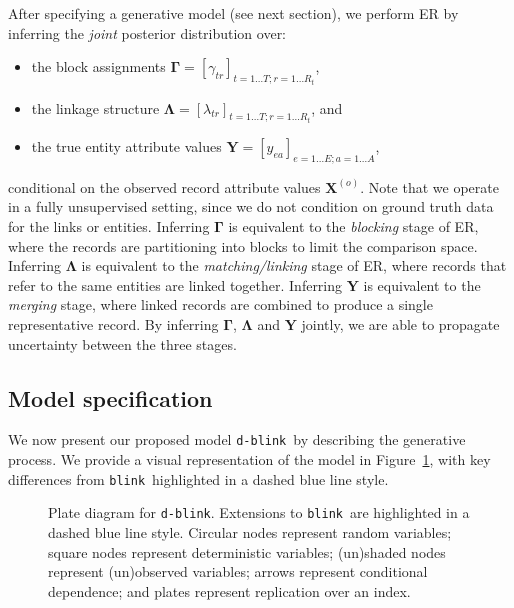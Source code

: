 \documentclass[12pt,letterpaper]{article}
\renewcommand\vec{\bm}
\newcommand{\1}[1]{\mathbb{I}\!\left[#1\right]} %
\newcommand{\dblink}{\texttt{\upshape \lowercase{d-blink}}} %
\newcommand{\blink}{\texttt{\upshape \lowercase{blink}}} %
\begin{document}
After specifying a generative model (see next section), we perform 
ER by inferring the \emph{joint} posterior distribution over:
\begin{itemize}
  \item the block assignments $\vec{\Gamma} = [\gamma_{tr}]_{t = 1 \ldots T; r = 1 \ldots R_t}$,
  \item the linkage structure $\vec{\Lambda} = [\lambda_{tr}]_{t = 1 \ldots T; r = 1 \ldots R_t}$, and 
  \item the true entity attribute values $\vec{Y} = [y_{ea}]_{e = 1 \ldots E; a = 1 \ldots A}$,
\end{itemize}
conditional on the observed record attribute values $\mathbf{X}^{(o)}$. 
Note that we operate in a fully unsupervised setting, since we do 
not condition on ground truth data for the links or entities. 
Inferring $\vec{\Gamma}$ is equivalent to the \emph{blocking} stage 
of ER, where the records are partitioning into blocks to limit the 
comparison space.
Inferring $\vec{\Lambda}$ is equivalent to the \emph{matching\slash linking} 
stage of ER, where records that refer to the same entities are linked together. 
Inferring $\vec{Y}$ is equivalent to the \emph{merging} stage, where 
linked records are combined to produce a single representative record. 
By inferring $\vec{\Gamma}$, $\vec{\Lambda}$ and $\vec{Y}$ jointly, we are 
able to propagate uncertainty between the three stages.

\subsection{Model specification}
\label{sec:model-specification}
We now present our proposed model \dblink\ by describing the generative 
process.
We provide a visual representation of the model in 
Figure~\ref{fig:plate-diagram}, with key differences from \blink\ 
highlighted in a dashed blue line style.

\begin{figure}
  \centering
  \resizebox{0.45\linewidth}{!}{%
    
  }
  \caption{Plate diagram for \dblink. 
    Extensions to \blink\ are highlighted in a dashed blue line style.
    Circular nodes represent random variables; square nodes represent 
    deterministic variables; (un)shaded nodes represent (un)observed variables; 
    arrows represent conditional dependence; and plates represent replication 
    over an index.
  }
  \label{fig:plate-diagram}
\end{figure}
\end{document}
